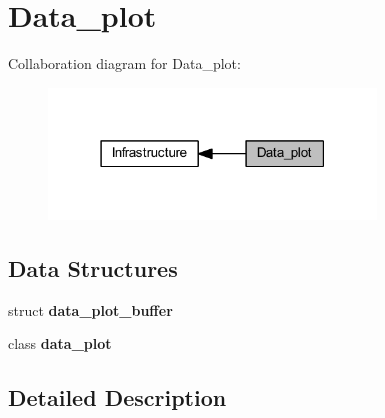 \section{Data\+\_\+plot}
\label{group__data__plot}
Collaboration diagram for Data\+\_\+plot\+:\nopagebreak
\begin{figure}[H]
\begin{center}
\leavevmode
\includegraphics[width=247pt]{group__data__plot}
\end{center}
\end{figure}
\subsection*{Data Structures}
\begin{DoxyCompactItemize}
\item 
struct \textbf{ data\+\_\+plot\+\_\+buffer}
\item 
class \textbf{ data\+\_\+plot}
\end{DoxyCompactItemize}


\subsection{Detailed Description}
